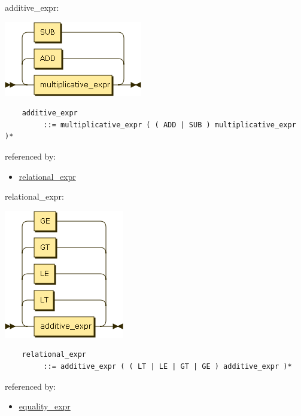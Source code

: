 \begin{minipage}{\textwidth}
    \protect\hypertarget{additive_expr}{}{additive\_expr:}

    \includegraphics[width=2.37500in,height=1.29167in]{diagram/additive_expr.png}

    \begin{verbatim}
    additive_expr
         ::= multiplicative_expr ( ( ADD | SUB ) multiplicative_expr )*
    \end{verbatim}

    referenced by:

    \begin{itemize}
            \tightlist
        \item
            \protect\hyperlink{relational_expr}{relational\_expr}
    \end{itemize}

\end{minipage}

\begin{minipage}{\textwidth}
    \protect\hypertarget{relational_expr}{}{relational\_expr:}

    \includegraphics[width=2.06250in,height=2.20833in]{diagram/relational_expr.png}

    \begin{verbatim}
    relational_expr
         ::= additive_expr ( ( LT | LE | GT | GE ) additive_expr )*
    \end{verbatim}

    referenced by:

    \begin{itemize}
            \tightlist
        \item
            \protect\hyperlink{equality_expr}{equality\_expr}
    \end{itemize}

\end{minipage}

